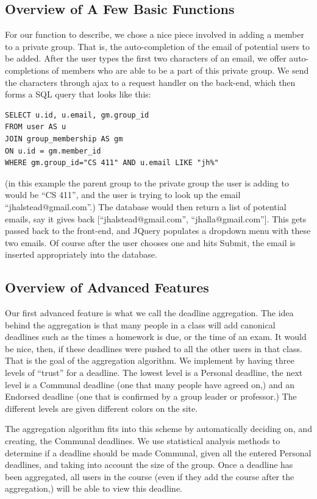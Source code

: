 \documentclass{article}
\begin{document}
		\subsection[Basic Functions]{Overview of A Few Basic Functions}
		For our function to describe, we chose a nice piece involved in adding
		a member to a private group. That is, the auto-completion of the email
		of potential users to be added. After the user types the first two
		characters of an email, we offer auto-completions of members who
		are able to be a part of this private group. We send the characters
		through ajax to a request handler on the back-end, which then forms
		a SQL query that looks like this:
\begin{verbatim}
SELECT u.id, u.email, gm.group_id
FROM user AS u
JOIN group_membership AS gm
ON u.id = gm.member_id
WHERE gm.group_id="CS 411" AND u.email LIKE "jh%"
\end{verbatim}
		(in this example the parent group to the private group the user is 
		adding to would be ``CS 411'', and the user is trying to look up the
		email ``jhalstead@gmail.com''.) The database would then return a list of
		potential emails, say it gives back [``jhalstead@gmail.com'',
		``jhalla@gmail.com'']. This gets passed back to the front-end, and JQuery
		populates a dropdown menu with these two emails. Of course after the
		user chooses one and hits Submit, the email is inserted appropriately
		into the database.

		\subsection[Advanced Functions]{Overview of Advanced Features}
		Our first advanced feature is what we call the deadline aggregation. The idea
		behind the aggregation is that many people in a class will add canonical deadlines
		such as the times a homework is due, or the time of an exam. It would be nice,
		then, if these deadlines were pushed to all the other users in that class.
		That is the goal of the aggregation algorithm. We implement by having
		three levels of ``trust'' for a deadline. The lowest level is a Personal
		deadline, the next level is a Communal deadline (one that many people have 
		agreed on,) and an Endorsed deadline (one that is confirmed by a group leader
		or professor.) The different levels are given different colors on the site.

		The aggregation algorithm fits into this scheme by automatically deciding
		on, and creating, the Communal deadlines. We use statistical analysis methods
		to determine if a deadline should be made Communal, given all the entered
		Personal deadlines, and taking into account the size of the group. Once a deadline
		has been aggregated, all users in the course (even if they add the course after
		the aggregation,) will be able to view this deadline.
\end{document}
